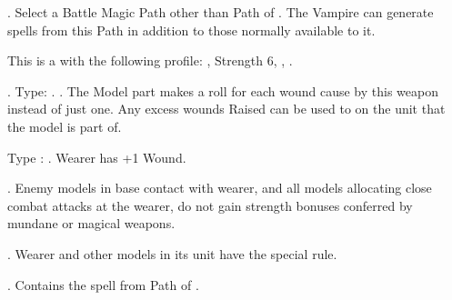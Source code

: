  \textbf{\bloodlinepower}. Select a Battle Magic Path other than Path of \nature . The Vampire can generate spells from this Path in addition to those normally available to it.

\endpricelist

\armymagicitems

\armymagicweapons

\startpricelist

 This is a \boltthrower{} \artilleryweapon{} with the following profile: , Strength 6, , .

 . Type: \hw . . The Model part makes a \vampiric{} roll for each  wound cause by this weapon instead of just one. Any excess wounds Raised can be used to \raisewounds{} on the unit that the model is part of.

\endpricelist

\armymagicarmor

\startpricelist

 Type : \platearmour . Wearer has +1 Wound.

\endpricelist

\armytalismans

\startpricelist

 . Enemy models in base contact with wearer, and all models allocating close combat attacks at the wearer, do not gain strength bonuses  conferred by mundane or magical weapons.

\endpricelist

\armyenchanteditems

\startpricelist

 . Wearer and other \rnf{} models in its unit have the \distracting{} special rule.

\endpricelist

\armyarcaneitems

\startpricelist

 . Contains the spell \necromancyspelltwo{} from Path of \necromancy .

